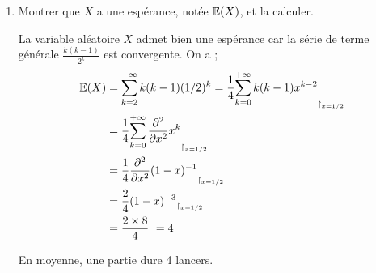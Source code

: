 \documentclass[a4paper]{tp_um}
\begin{document}
\begin{enumerate}
\begin{enumerate}
\end{enumerate}
\item Montrer que $X$ a une esp\'erance, not\'ee $\mathbb{E}(X)$, et la calculer.

\bigskip

La variable aléatoire $X$ admet bien une espérance car la série de terme générale $\frac{k(k-1)}{2^k} $ est convergente.
On a ;
\begin{align*}
	\E(X) &= \sum_{k=2}^{+ \infty} k (k-1) (1/2)^{k} = \frac 1 4 \rst{\sum_{k=0}^{+ \infty} k (k-1) x^{k-2} }{x=1/2 } \\
	& =  \frac 1 4\rst{\sum_{k=0}^{+ \infty} \frac{\partial^2}{\partial x^2}x^{k} }{x=1/2 }  \\
	& = \frac 1 4 \rst{ \frac{\partial^2}{\partial x^2}(1-x)^{-1} }{x=1/2 } \\
	& = \frac 2 4 \rst{ (1-x)^{-3} }{x=1/2 } \\
	& = \frac{2 \times 8}{4} = 4
\end{align*}

En moyenne, une partie dure 4 lancers.

%
%
%
%
%
%
\end{enumerate}
\end{document}
